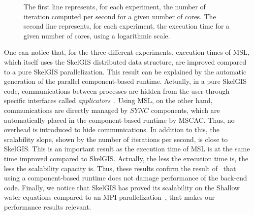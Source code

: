 \begin{figure}
\begin{center}
{
}
\end{center}
\caption{The first line represents, for each experiment, the number of iteration computed per second for a given number of cores. The second line represents, for each experiment, the execution time for a given number of cores, using a logarithmic scale.}
\label{fig:perfs}
\end{figure}

One can notice that, for the three different experiments, execution times of MSL, which itself uses the SkelGIS distributed data structure, are improved compared to a pure SkelGIS parallelization. This result can be explained by the automatic generation of the parallel component-based runtime. Actually, in a pure SkelGIS code, communications between processes are hidden from the user through specific interfaces called \emph{applicators}~\cite{CPE:CPE3494}. Using MSL, on the other hand, communications are directly managed by $SYNC$ components, which are automatically placed in the component-based runtime by MSCAC. Thus, no overhead is introduced to hide communications.
In addition to this, the scalability slope, shown by the number of iterations per second, is close to SkelGIS. This is an important result as the execution time of MSL is at the same time improved compared to SkelGIS. Actually, the less the execution time is, the less the scalability capacity is. Thus, these results confirm the result of~\cite{l2c} that using a component-based runtime does not damage performance of the back-end code. Finally, we notice that SkelGIS has proved its scalability on the Shallow water equations compared to an MPI parallelization~\cite{CPE:CPE3494}, that makes our performance results relevant. 
